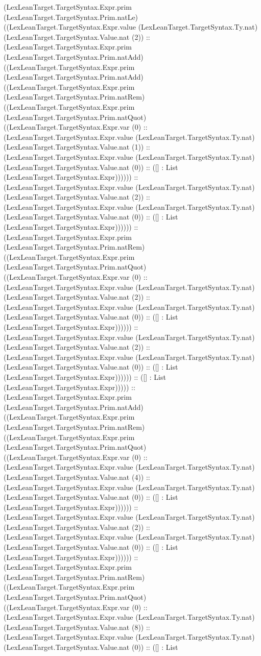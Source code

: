 \documentclass[11pt]{article}
\begin{document}
(LexLeanTarget.TargetSyntax.Expr.prim (LexLeanTarget.TargetSyntax.Prim.natLe) ((LexLeanTarget.TargetSyntax.Expr.value (LexLeanTarget.TargetSyntax.Ty.nat) (LexLeanTarget.TargetSyntax.Value.nat (2)) :: (LexLeanTarget.TargetSyntax.Expr.prim (LexLeanTarget.TargetSyntax.Prim.natAdd) ((LexLeanTarget.TargetSyntax.Expr.prim (LexLeanTarget.TargetSyntax.Prim.natAdd) ((LexLeanTarget.TargetSyntax.Expr.prim (LexLeanTarget.TargetSyntax.Prim.natRem) ((LexLeanTarget.TargetSyntax.Expr.prim (LexLeanTarget.TargetSyntax.Prim.natQuot) ((LexLeanTarget.TargetSyntax.Expr.var (0) :: (LexLeanTarget.TargetSyntax.Expr.value (LexLeanTarget.TargetSyntax.Ty.nat) (LexLeanTarget.TargetSyntax.Value.nat (1)) :: (LexLeanTarget.TargetSyntax.Expr.value (LexLeanTarget.TargetSyntax.Ty.nat) (LexLeanTarget.TargetSyntax.Value.nat (0)) :: ([] : List (LexLeanTarget.TargetSyntax.Expr)))))) :: (LexLeanTarget.TargetSyntax.Expr.value (LexLeanTarget.TargetSyntax.Ty.nat) (LexLeanTarget.TargetSyntax.Value.nat (2)) :: (LexLeanTarget.TargetSyntax.Expr.value (LexLeanTarget.TargetSyntax.Ty.nat) (LexLeanTarget.TargetSyntax.Value.nat (0)) :: ([] : List (LexLeanTarget.TargetSyntax.Expr)))))) :: (LexLeanTarget.TargetSyntax.Expr.prim (LexLeanTarget.TargetSyntax.Prim.natRem) ((LexLeanTarget.TargetSyntax.Expr.prim (LexLeanTarget.TargetSyntax.Prim.natQuot) ((LexLeanTarget.TargetSyntax.Expr.var (0) :: (LexLeanTarget.TargetSyntax.Expr.value (LexLeanTarget.TargetSyntax.Ty.nat) (LexLeanTarget.TargetSyntax.Value.nat (2)) :: (LexLeanTarget.TargetSyntax.Expr.value (LexLeanTarget.TargetSyntax.Ty.nat) (LexLeanTarget.TargetSyntax.Value.nat (0)) :: ([] : List (LexLeanTarget.TargetSyntax.Expr)))))) :: (LexLeanTarget.TargetSyntax.Expr.value (LexLeanTarget.TargetSyntax.Ty.nat) (LexLeanTarget.TargetSyntax.Value.nat (2)) :: (LexLeanTarget.TargetSyntax.Expr.value (LexLeanTarget.TargetSyntax.Ty.nat) (LexLeanTarget.TargetSyntax.Value.nat (0)) :: ([] : List (LexLeanTarget.TargetSyntax.Expr)))))) :: ([] : List (LexLeanTarget.TargetSyntax.Expr))))) :: (LexLeanTarget.TargetSyntax.Expr.prim (LexLeanTarget.TargetSyntax.Prim.natAdd) ((LexLeanTarget.TargetSyntax.Expr.prim (LexLeanTarget.TargetSyntax.Prim.natRem) ((LexLeanTarget.TargetSyntax.Expr.prim (LexLeanTarget.TargetSyntax.Prim.natQuot) ((LexLeanTarget.TargetSyntax.Expr.var (0) :: (LexLeanTarget.TargetSyntax.Expr.value (LexLeanTarget.TargetSyntax.Ty.nat) (LexLeanTarget.TargetSyntax.Value.nat (4)) :: (LexLeanTarget.TargetSyntax.Expr.value (LexLeanTarget.TargetSyntax.Ty.nat) (LexLeanTarget.TargetSyntax.Value.nat (0)) :: ([] : List (LexLeanTarget.TargetSyntax.Expr)))))) :: (LexLeanTarget.TargetSyntax.Expr.value (LexLeanTarget.TargetSyntax.Ty.nat) (LexLeanTarget.TargetSyntax.Value.nat (2)) :: (LexLeanTarget.TargetSyntax.Expr.value (LexLeanTarget.TargetSyntax.Ty.nat) (LexLeanTarget.TargetSyntax.Value.nat (0)) :: ([] : List (LexLeanTarget.TargetSyntax.Expr)))))) :: (LexLeanTarget.TargetSyntax.Expr.prim (LexLeanTarget.TargetSyntax.Prim.natRem) ((LexLeanTarget.TargetSyntax.Expr.prim (LexLeanTarget.TargetSyntax.Prim.natQuot) ((LexLeanTarget.TargetSyntax.Expr.var (0) :: (LexLeanTarget.TargetSyntax.Expr.value (LexLeanTarget.TargetSyntax.Ty.nat) (LexLeanTarget.TargetSyntax.Value.nat (8)) :: (LexLeanTarget.TargetSyntax.Expr.value (LexLeanTarget.TargetSyntax.Ty.nat) (LexLeanTarget.TargetSyntax.Value.nat (0)) :: ([] : List 
\end{document}
